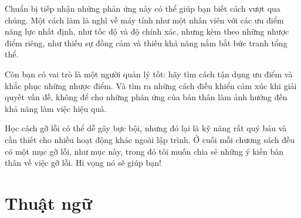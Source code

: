 \documentclass[11pt]{book}
\begin{document}
Chuẩn bị tiếp nhận những phản ứng này có thể giúp bạn biết cách
vượt qua chúng. Một cách làm là nghĩ về máy tính như một nhân
viên với các ưu điểm năng lực nhất định, như tốc độ và độ chính
xác, nhưng kèm theo những nhược điểm riêng, như thiếu sự đồng cảm
và thiếu khả năng nắm bắt bức tranh tổng thể.

Còn bạn có vai trò là một người quản lý tốt: hãy tìm cách tận
dụng ưu điểm và khắc phục những nhược điểm. Và tìm ra những cách
điều khiển cảm xúc khi giải quyết vấn đề, không để cho những phản
ứng của bản thân làm ảnh hưởng đến khả năng làm việc hiệu quả.

Học cách gỡ lỗi có thể dễ gây bực bội, nhưng đó lại là kỹ năng rất
quý báu và cần thiết cho nhiều hoạt động khác ngoài lập trình. Ở
cuối mỗi chương sách đều có một mục gỡ lỗi, như mục này, trong đó
tôi muốn chia sẻ những ý kiến bản thân về việc gỡ lỗi. Hi vọng nó
sẽ giúp bạn!


\section{Thuật ngữ}
\end{document}
